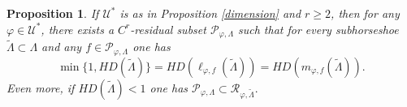 \documentclass[12pt]{amsart}
\theoremstyle{plain} %
\newtheorem{proposition}[theorem]{Proposition}
\theoremstyle{definition} %
\numberwithin{equation}{section}
\begin{document}
\begin{proposition} \label{lagrange1}
If $\mathcal{U}^*$ is as in Proposition \ref{dimension} and $r \geq 2$, then for any $\varphi \in \mathcal{U}^*$, there exists a $C^r$-residual subset $\mathcal{P}_{\varphi,\Lambda}$ such that for every subhorseshoe $\widetilde{\Lambda}\subset\Lambda$ and any $f\in \mathcal{P}_{\varphi,\Lambda}$ one has 
$$\min \{1,HD(\widetilde{\Lambda})\}=HD(\ell_{\varphi,f}(\widetilde{\Lambda}))=HD(m_{\varphi,f}(\widetilde{\Lambda})).$$
Even more, if $HD(\tilde{\Lambda})<1$ one has $\mathcal{P}_{\varphi,\Lambda}\subset \mathcal{R}_{\varphi,\tilde{\Lambda}}.$ 
\end{proposition}
\end{document}
